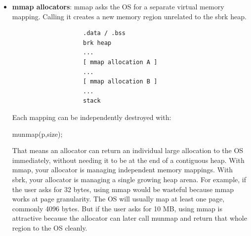 \documentclass{report}
\begin{document}
\begin{itemize}
\begin{cppcode}
                void *arena = sbrk(4096);
                \end{cppcode}
                \bigbreak \noindent 
                Now you have a 4096-byte arena. Then a user asks for 32 bytes. You do not call sbrk(32) necessarily. Instead, you split part of the arena.
                \bigbreak \noindent 
                So the arena is the larger pool, and each allocation is a block inside that pool. Calling the OS for memory is relatively expensive. An allocator usually does not want to ask the OS every time the user requests a tiny allocation.
                \bigbreak \noindent 
                With sbrk, the traditional heap itself can be treated as one arena. When the arena runs out of usable free blocks, your allocator extends it.
                \bigbreak \noindent 
                So in a toy allocator, your “arena” may just be the continuous heap region between the first block you got from sbrk and the current program break.
            \item \textbf{mmap allocators}: mmap asks the OS for a separate virtual memory mapping. Calling it creates a new memory region unrelated to the sbrk heap.
                \begin{verbatim}
                    .data / .bss
                    brk heap
                    ...
                    [ mmap allocation A ]
                    ...
                    [ mmap allocation B ]
                    ...
                    stack
                \end{verbatim}
                Each mapping can be independently destroyed with:
                \bigbreak \noindent 
                \begin{cppcode}
                munmap(p,size);
                \end{cppcode}
                \bigbreak \noindent 
                That means an allocator can return an individual large allocation to the OS immediately, without needing it to be at the end of a contiguous heap.
                \bigbreak \noindent 
                With mmap, your allocator is managing independent memory mappings. With sbrk, your allocator is managing a single growing heap arena.
                \bigbreak \noindent 
                For example, if the user asks for 32 bytes, using mmap would be wasteful because mmap works at page granularity. The OS will usually map at least one page, commonly 4096 bytes. But if the user asks for 10 MB, using mmap is attractive because the allocator can later call munmap and return that whole region to the OS cleanly.

\end{itemize}
\end{document}
